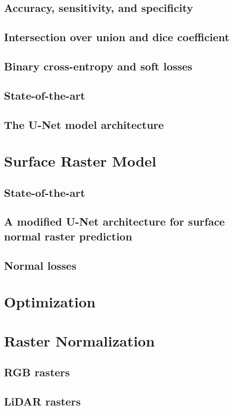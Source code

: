 \subsection{Accuracy, sensitivity, and specificity}

\subsection{Intersection over union and dice coefficient}

\subsection{Binary cross-entropy and soft losses}

\subsection{State-of-the-art}%
\label{sec:segmentation-state-of-the-art}

\subsection{The U-Net model architecture}%
\label{sec:unet}


\section{Surface Raster Model}
\subsection{State-of-the-art}
\subsection{A modified U-Net architecture for surface normal raster prediction}
\subsection{Normal losses}

\section{Optimization}


\section{Raster Normalization}%
\label{sec:raster-normalization}

\subsection{RGB rasters}
\subsection{LiDAR rasters}
